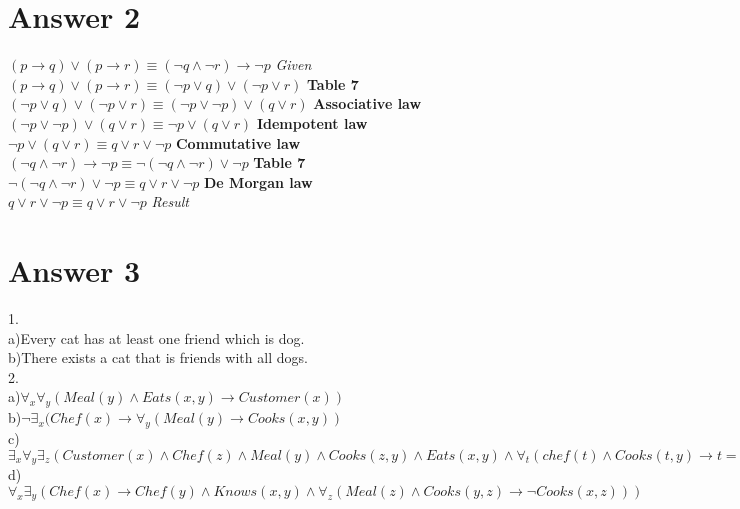 \documentclass[12pt]{article}
\begin{document}
\section*{Answer 2}
$(p \to q) \lor (p \to r) \equiv (\neg q \land \neg r) \to \neg p$ \textit{Given} \\

$(p \to q) \lor (p \to r) \equiv (\neg p \lor q) \lor (\neg p \lor r)$  \textbf{Table 7} \\

$(\neg p \lor q) \lor (\neg p \lor r) \equiv (\neg p \lor \neg p) \lor (q \lor r)$ \textbf{Associative law}\\

$(\neg p \lor \neg p) \lor (q \lor r) \equiv \neg p \lor (q \lor r)$ \textbf{Idempotent law} \\

$\neg p \lor (q \lor r) \equiv q \lor r \lor \neg p$ \textbf{Commutative law} \\

$(\neg q \land \neg r) \to \neg p \equiv \neg(\neg q \land \neg r) \lor \neg p$ \textbf{Table 7}\\

$\neg(\neg q \land \neg r) \lor \neg p \equiv q \lor r \lor \neg p$ \textbf{De Morgan law} \\

$q \lor r \lor \neg p \equiv q \lor r \lor \neg p$ \textit{Result}\\

\section*{Answer 3}
1. \\
a)Every cat has at least one friend which is dog.\\
b)There exists a cat that is friends with all dogs. \\
2.\\
a)$\forall_x\forall_y(Meal(y) \land Eats(x,y) \to Customer(x))$ \\
b)$\neg \exists_x(Chef(x) \to \forall_y(Meal(y) \to Cooks(x,y))$ \\
c)$\exists_x\forall_y\exists_z(Customer(x) \land Chef(z) \land Meal(y) \land Cooks(z,y) \land Eats(x,y) \land \forall_t(chef(t) \land Cooks(t,y) \to t = z))$ \\
d)$\forall_x\exists_y(Chef(x) \to Chef(y) \land Knows(x,y) \land \forall_z(Meal(z) \land Cooks(y,z) \to \neg Cooks(x,z)))$
\end{document}
